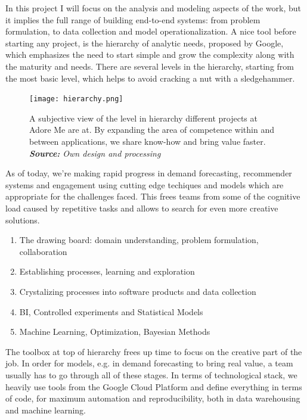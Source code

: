 \documentclass[12pt]{article}
\begin{document}
In this project I will focus on the analysis and modeling aspects of the work, but it implies the full range of building end-to-end systems: from problem formulation, to data collection and model operationalization. A nice tool before starting any project, is the hierarchy of analytic needs, proposed by Google, which emphasizes the need to start simple and grow the complexity along with the maturity and needs. There are several levels in the hierarchy, starting from the most basic level, which helps to avoid cracking a nut with a sledgehammer.

\begin{figure}[!ht]
	\centering
	\texttt{[image: hierarchy.png]}%
	\caption{A subjective view of the level in hierarchy different projects at Adore Me are at. By expanding the area of competence within and between applications, we share know-how and bring value faster. \\
		\textit{\textbf{Source:} Own design and processing}}
\end{figure}

As of today, we're making rapid progress in demand forecasting, recommender systems and engagement using cutting edge techiques and models which are appropriate for the challenges faced. This frees teams from some of the cognitive load caused by repetitive tasks and allows to search for even more creative solutions.

\begin{enumerate}
	\item The drawing board: domain understanding, problem formulation, collaboration
	\item Establishing processes, learning and exploration
	\item Crystalizing processes into software products and data collection
	\item BI, Controlled experiments and Statistical Models 
	\item Machine Learning, Optimization, Bayesian Methods
\end{enumerate}

The toolbox at top of hierarchy frees up time to focus on the creative part of the job. In order for models, e.g. in demand forecasting to bring real value, a team usually has to go through all of these stages. In terms of technological stack, we heavily use tools from the Google Cloud Platform and define everything in terms of code, for maximum automation and reproducibility, both in data warehousing and machine learning.
\end{document}
